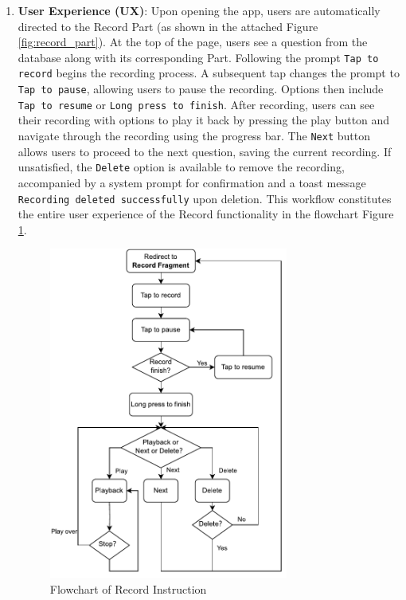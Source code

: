 \documentclass[conference,10pt,letterpaper]{IEEEtran}
\begin{document}
\begin{enumerate}
		\item \textbf{User Experience (UX)}: 
		Upon opening the app, users are automatically directed to the Record Part (as shown in the attached Figure \ref{fig:record_part}). At the top of the page, users see a question from the database along with its corresponding Part. Following the prompt \texttt{Tap to record} begins the recording process. A subsequent tap changes the prompt to \texttt{Tap to pause}, allowing users to pause the recording. Options then include \texttt{Tap to resume} or \texttt{Long press to finish}. After recording, users can see their recording with options to play it back by pressing the play button and navigate through the recording using the progress bar. The \texttt{Next} button allows users to proceed to the next question, saving the current recording. If unsatisfied, the \texttt{Delete} option is available to remove the recording, accompanied by a system prompt for confirmation and a toast message \texttt{Recording deleted successfully} upon deletion. This workflow constitutes the entire user experience of the Record functionality in the flowchart Figure \ref{fig:flowhart}.
		\begin{figure}[htbp]
			\centerline{\includegraphics[width=3.1in]{src/flowchart.pdf}}
			\caption{Flowchart of Record Instruction}
			\label{fig:flowhart}
		\end{figure}
		

\end{enumerate}
\end{document}
